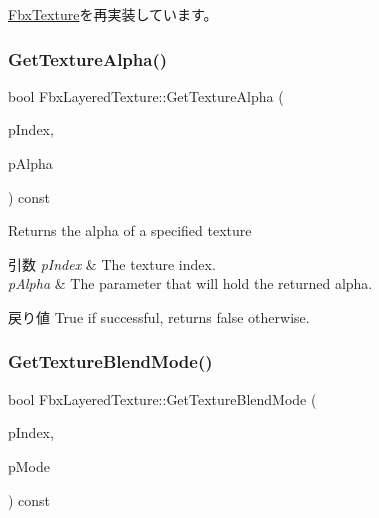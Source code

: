 \hyperlink{class_fbx_texture_a321c23c2dc2e91c58e2fcc2ed7d29f9e}{Fbx\+Texture}を再実装しています。

\mbox{\label{class_fbx_layered_texture_a2d38e409c9671b2850d1260d881e1940}} 
\subsubsection{\texorpdfstring{Get\+Texture\+Alpha()}{GetTextureAlpha()}}
{\footnotesize\ttfamily bool Fbx\+Layered\+Texture\+::\+Get\+Texture\+Alpha (\begin{DoxyParamCaption}\item[{int}]{p\+Index,  }\item[{double \&}]{p\+Alpha }\end{DoxyParamCaption}) const}

Returns the alpha of a specified texture 
\begin{DoxyParams}{引数}
{\em p\+Index} & The texture index. \\
\hline
{\em p\+Alpha} & The parameter that will hold the returned alpha. \\
\hline
\end{DoxyParams}
\begin{DoxyReturn}{戻り値}
{\ttfamily True} if successful, returns {\ttfamily false} otherwise. 
\end{DoxyReturn}
\mbox{\label{class_fbx_layered_texture_ae0b5014964899ff448c859d408d8614a}} 
\subsubsection{\texorpdfstring{Get\+Texture\+Blend\+Mode()}{GetTextureBlendMode()}}
{\footnotesize\ttfamily bool Fbx\+Layered\+Texture\+::\+Get\+Texture\+Blend\+Mode (\begin{DoxyParamCaption}\item[{int}]{p\+Index,  }\item[{\hyperlink{class_fbx_layered_texture_af291d42b0329513909d2ddf48f56f5ba}{E\+Blend\+Mode} \&}]{p\+Mode }\end{DoxyParamCaption}) const}

